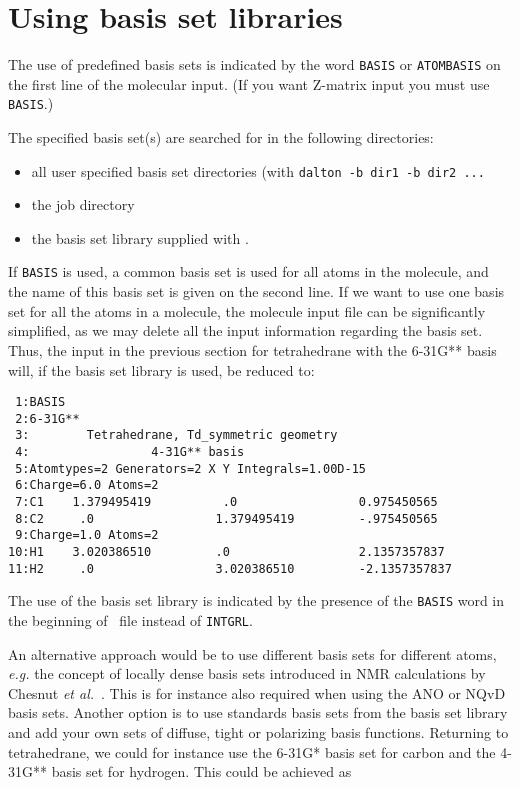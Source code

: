 \section{Using basis set libraries}\label{sec:molbasis}

The use of predefined basis sets is indicated
by the word {\tt BASIS} or {\tt ATOMBASIS} on the first line of the
molecular input.
(If you want Z-matrix input you must use {\tt BASIS}.)

The specified basis set(s) are searched for in the following directories:
\begin{itemize}
\item all user specified basis set directories (with {\tt dalton -b dir1 -b dir2 ...}
\item the job directory
\item the basis set library supplied with \dalton.
\end{itemize}

If {\tt BASIS} is used, a common basis set is used for all atoms in
the molecule, and the name of this basis set is given on the second line.
If we want to use one basis set for all the
atoms in a molecule, the molecule input file can be significantly
simplified, as we may delete all the input information regarding the
basis set. Thus, the input in the previous section for tetrahedrane
with the 6-31G** basis will, if the basis set library is used,  be reduced
to:

\begin{verbatim}
 1:BASIS
 2:6-31G**
 3:        Tetrahedrane, Td_symmetric geometry
 4:                 4-31G** basis
 5:Atomtypes=2 Generators=2 X Y Integrals=1.00D-15
 6:Charge=6.0 Atoms=2
 7:C1    1.379495419          .0                 0.975450565
 8:C2     .0                 1.379495419         -.975450565
 9:Charge=1.0 Atoms=2
10:H1    3.020386510         .0                  2.1357357837
11:H2     .0                 3.020386510         -2.1357357837
\end{verbatim}

The use of the basis set library is indicated by the presence of the
\verb|BASIS| word in the beginning of \molinp\ file instead of
\verb|INTGRL|.

An alternative approach would be to use different basis sets for
different atoms, {\it e.g.\/} the concept of locally
dense basis sets
introduced in NMR calculations by Chesnut {\it et
al.\/}~\cite{dbcberkdmdaejcc14}. This is for instance also required
when using the ANO or
NQvD
basis sets. Another option is to use
standards basis sets from the basis set 
library and add your own sets
of diffuse, tight or polarizing basis
functions. Returning to
tetrahedrane, we could for instance use the 6-31G* basis set for
carbon and the 4-31G** basis set for hydrogen. This could be achieved
as

